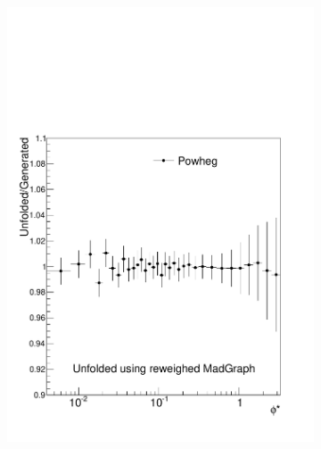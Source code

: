 \begin{figure}[!htbp]
    \centering
    \begin{subfigure}[b]{\SideBySidePlotWidth}
        \includegraphics[width=\textwidth]{figures/BinM_MP_flat.pdf}
        \caption{}
        \label{fig:unfolding_flat_powheg_unfolded_with_madgraph}
    \end{subfigure}%
    \begin{subfigure}[b]{\SideBySidePlotWidth}

\end{subfigure}
\end{figure}
